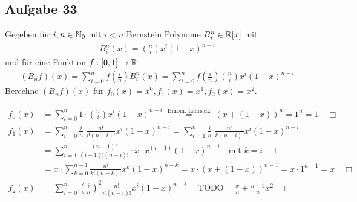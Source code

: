 \subsection*{Aufgabe 33}
Gegeben für $i, n \in \mathbb N_0$ mit $i < n$ Bernstein Polynome $B_i^n \in \mathbb R[x]$ mit
\begin{align}
  B_i^n(x) = \binom{n}{i} x^i(1 - x)^{n-i}
\end{align}
und für eine Funktion $f: [0,1] \rightarrow \mathbb R$
\begin{align}
  (B_n f)(x) = \sum_{i = 0}^n f\left(\frac{i}{n}\right) B_i^n(x) =
  \sum_{i = 0}^n f\left(\frac{i}{n}\right) \binom{n}{i} x^i(1 - x)^{n-i}
\end{align}
Berechne $(B_n f)(x)$ für $f_0(x) = x^0, f_1(x) = x^1, f_2(x) = x^2$.

\begin{align*}
  f_0(x) &= \sum_{i = 0}^n 1 \cdot \binom{n}{i} x^i(1 - x)^{n-i}
    \; \overset{\text{Binom. Lehrsatz}}{=} \; \left( x + (1 -x) \right)^n = 1^n = 1 \quad \Box\\
  f_1(x) &= \sum_{i = 0}^n \frac{i}{n} \; \frac{n!}{i! (n-i)!} x^i(1 - x)^{n-i} =
    \sum_{i = 1}^n \frac{i}{n} \; \frac{n!}{i! (n-i)!} x^i(1 - x)^{n-i} \\
    & = \sum_{i = 1}^n \frac{(n-1)!}{(i-1)! (n-i)!} \cdot x \cdot x^{(i-1)}(1 - x)^{n-i}
    \quad \text{mit $k = i - 1$} \\
    & = x  \cdot \sum_{k = 0}^{n-1} \frac{n!}{k! (n-k)!} x^k(1 - x)^{n-k}
    = x \cdot \left( x + (1 -x) \right)^{n-1} = x \cdot 1^{n-1} = x  \quad \Box\\
  f_2(x) &= \sum_{i = 0}^n \left(\frac{i}{n}\right)^2 \frac{n!}{i! (n-i)!} x^i(1 - x)^{n-i} =
  \text{TODO} = \frac{x}{n} + \frac{n-1}{n} x^2  \quad \Box
\end{align*}

